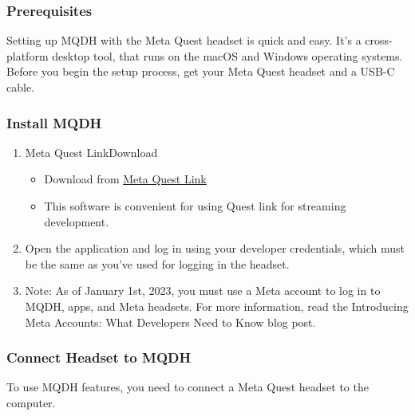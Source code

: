 \documentclass{article}
\begin{document}
\subsubsection{Prerequisites}

Setting up MQDH with the Meta Quest headset is quick and easy. It’s a cross-platform desktop tool, that runs on the macOS and Windows operating systems. Before you begin the setup process, get your Meta Quest headset and a USB-C cable.

\subsubsection{Install MQDH}

\begin{enumerate}
    \item Meta Quest LinkDownload
    \begin{itemize}
        \item Download from \href{https://www.oculus.com/download_app/?id=1582076955407037}{Meta Quest Link}
        \item This software is convenient for using Quest link for streaming development.
    \end{itemize}
    \item Open the application and log in using your developer credentials, which must be the same as you’ve used for logging in the headset.
    \item Note: As of January 1st, 2023, you must use a Meta account to log in to MQDH, apps, and Meta headsets. For more information, read the Introducing Meta Accounts: What Developers Need to Know blog post.
\end{enumerate}

\subsubsection{Connect Headset to MQDH}

To use MQDH features, you need to connect a Meta Quest headset to the computer.
\end{document}
